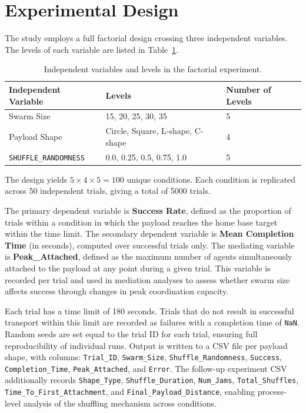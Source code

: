 \section{Experimental Design}
\label{sec:exp_design}

The study employs a full factorial design crossing three independent variables. The levels of each variable are listed in Table~\ref{tab:ivs}.

\begin{table}[H]
\centering
\caption{Independent variables and levels in the factorial experiment.}
\label{tab:ivs}
\begin{tabular}{@{}lll@{}}
\toprule
\textbf{Independent Variable} & \textbf{Levels} & \textbf{Number of Levels} \\
\midrule
Swarm Size & 15, 20, 25, 30, 35 & 5 \\
Payload Shape & Circle, Square, L-shape, C-shape & 4 \\
\texttt{SHUFFLE\_RANDOMNESS} & 0.0, 0.25, 0.5, 0.75, 1.0 & 5 \\
\bottomrule
\end{tabular}
\end{table}

\noindent The design yields $5 \times 4 \times 5 = 100$ unique conditions. Each condition is replicated across 50 independent trials, giving a total of 5000 trials.

The primary dependent variable is \textbf{Success Rate}, defined as the proportion of trials within a condition in which the payload reaches the home base target within the time limit. The secondary dependent variable is \textbf{Mean Completion Time} (in seconds), computed over successful trials only. The mediating variable is \textbf{Peak\_Attached}, defined as the maximum number of agents simultaneously attached to the payload at any point during a given trial. This variable is recorded per trial and used in mediation analyses to assess whether swarm size affects success through changes in peak coordination capacity.

Each trial has a time limit of 180 seconds. Trials that do not result in successful transport within this limit are recorded as failures with a completion time of \texttt{NaN}. Random seeds are set equal to the trial ID for each trial, ensuring full reproducibility of individual runs. Output is written to a CSV file per payload shape, with columns: \texttt{Trial\_ID}, \texttt{Swarm\_Size}, \texttt{Shuffle\_Randomness}, \texttt{Success}, \texttt{Completion\_Time}, \texttt{Peak\_Attached}, and \texttt{Error}. The follow-up experiment CSV additionally records \texttt{Shape\_Type}, \texttt{Shuffle\_Duration}, \texttt{Num\_Jams}, \texttt{Total\_Shuffles}, \texttt{Time\_To\_First\_Attachment}, and \texttt{Final\_Payload\_Distance}, enabling process-level analysis of the shuffling mechanism across conditions.

